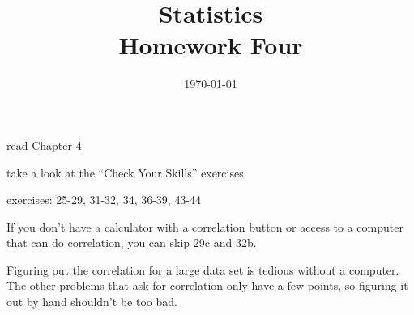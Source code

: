 \documentclass{exam}
\title{Statistics \\ Homework Four}
\date{\today}
\author{}
\begin{document}
  \maketitle

  \ifprintanswers
  \else

    \begin{itemize*}
      \item read Chapter 4 
      \item take a look at the ``Check Your Skills'' exercises
      \item exercises: 25-29, 31-32, 34, 36-39, 43-44
    \end{itemize*}

    If you don't have a calculator with a correlation button or access to a computer
    that can do correlation, you can skip 29c and 32b.  
    
    Figuring out the correlation for a large data set is tedious without a computer.
    The other problems that ask for correlation only have a few points, so figuring
    it out by hand shouldn't be too bad.

  \fi
\end{document}
